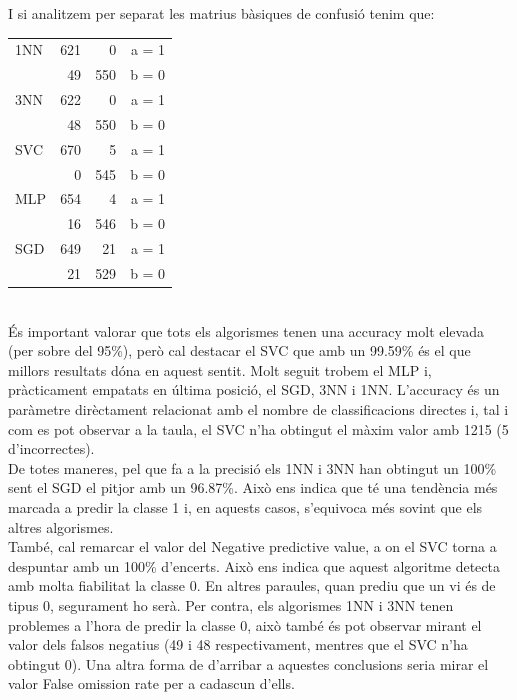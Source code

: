 \documentclass{article} %
\begin{document}
{	I si analitzem per separat les matrius bàsiques de confusió tenim que: \\

	{\selectfont\small
	\begin{tabular}{l | r r | r}
		1NN & 621 & 0 & a = 1 \\
		& 49 & 550 & b = 0 \\ \hline
		3NN & 622 & 0 & a = 1 \\
		& 48 & 550 & b = 0 \\ \hline
		SVC & 670 & 5 & a = 1 \\
		& 0 & 545 & b = 0 \\ \hline
		MLP & 654 & 4 & a = 1 \\
		& 16 & 546 & b = 0 \\ \hline
		SGD & 649 & 21 & a = 1 \\
		& 21 & 529 & b = 0 \\
	\end{tabular}
	} \\

	És important valorar que tots els algorismes tenen una accuracy molt elevada (per sobre del 95\%), però cal destacar el SVC que amb un 99.59\% és el que millors resultats dóna en aquest sentit. Molt seguit trobem el MLP i, pràcticament empatats en última posició, el SGD, 3NN i 1NN. L'accuracy és un paràmetre dirèctament relacionat amb el nombre de classificacions directes i, tal i com es pot observar a la taula, el SVC n'ha obtingut el màxim valor amb 1215 (5 d'incorrectes).\\

	De totes maneres, pel que fa a la precisió els 1NN i 3NN han obtingut un 100\% sent el SGD el pitjor amb un 96.87\%. Això ens indica que té una tendència més marcada a predir la classe 1 i, en aquests casos, s'equivoca més sovint que els altres algorismes. \\

	També, cal remarcar el valor del Negative predictive value, a on el SVC torna a despuntar amb un 100\% d'encerts. Això ens indica que aquest algoritme detecta amb molta fiabilitat la classe 0. En altres paraules, quan prediu que un vi és de tipus 0, segurament ho serà. Per contra, els algorismes 1NN i 3NN tenen problemes a l'hora de predir la classe 0, això també és pot observar mirant el valor dels falsos negatius (49 i 48 respectivament, mentres que el SVC n'ha obtingut 0). Una altra forma de d'arribar a aquestes conclusions seria mirar el valor False omission rate per a cadascun d'ells.\\

}
\end{document}
